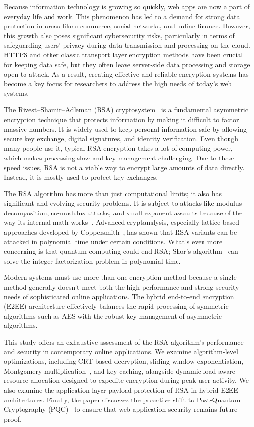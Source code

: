 \documentclass[conference]{IEEEtran}
\begin{document}
Because information technology is growing so quickly, web apps are now a part of everyday life and work. This phenomenon has led to a demand for strong data protection in areas like e-commerce, social networks, and online finance. However, this growth also poses significant cybersecurity risks, particularly in terms of safeguarding users' privacy during data transmission and processing on the cloud. HTTPS and other classic transport layer encryption methods have been crucial for keeping data safe, but they often leave server-side data processing and storage open to attack. As a result, creating effective and reliable encryption systems has become a key focus for researchers to address the high needs of today's web systems.

The Rivest--Shamir--Adleman (RSA) cryptosystem~\cite{rivest1978} is a fundamental asymmetric encryption technique that protects information by making it difficult to factor massive numbers. It is widely used to keep personal information safe by allowing secure key exchange, digital signatures, and identity verification. Even though many people use it, typical RSA encryption takes a lot of computing power, which makes processing slow and key management challenging. Due to these speed issues, RSA is not a viable way to encrypt large amounts of data directly. Instead, it is mostly used to protect key exchanges.

The RSA algorithm has more than just computational limits; it also has significant and evolving security problems. It is subject to attacks like modulus decomposition, co-modulus attacks, and small exponent assaults because of the way its internal math works~\cite{boneh1999}. Advanced cryptanalysis, especially lattice-based approaches developed by Coppersmith~\cite{coppersmith1997}, has shown that RSA variants can be attacked in polynomial time under certain conditions. What's even more concerning is that quantum computing could end RSA; Shor's algorithm~\cite{shor1997} can solve the integer factorization problem in polynomial time.

Modern systems must use more than one encryption method because a single method generally doesn't meet both the high performance and strong security needs of sophisticated online applications. The hybrid end-to-end encryption (E2EE) architecture effectively balances the rapid processing of symmetric algorithms such as AES with the robust key management of asymmetric algorithms.

This study offers an exhaustive assessment of the RSA algorithm's performance and security in contemporary online applications. We examine algorithm-level optimizations, including CRT-based decryption, sliding-window exponentiation, Montgomery multiplication~\cite{montgomery1985}, and key caching, alongside dynamic load-aware resource allocation designed to expedite encryption during peak user activity. We also examine the application-layer payload protection of RSA in hybrid E2EE architectures. Finally, the paper discusses the proactive shift to Post-Quantum Cryptography (PQC)~\cite{nist2024} to ensure that web application security remains future-proof.
\end{document}

